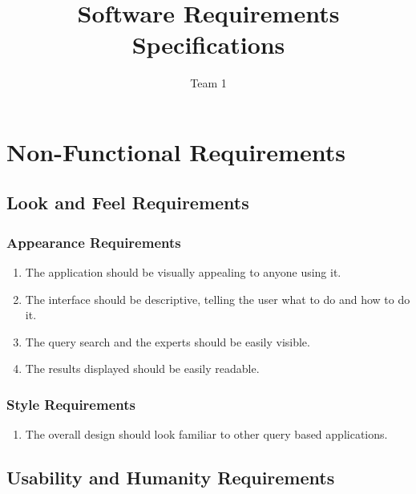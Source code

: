 \documentclass[]{article}
\title{Software Requirements Specifications}
\author{Team 1}
\begin{document}
\maketitle	

\section{Non-Functional Requirements} \label{nfreq}
\label{sec:non-functional_requirements}
\subsection{Look and Feel Requirements}
\label{sub:look_and_feel_requirements}


\subsubsection{Appearance Requirements}
\label{ssub:appearance_requirements}
\begin{enumerate}[{LF}1. ]
	\item The application should be visually appealing to anyone using it.
	\item The interface should be descriptive, telling the user what to do and how to do it.
	\item The query search and the experts should be easily visible.
	\item The results displayed should be easily readable.
	\setcounter{placeholder}{\theenumi}
\end{enumerate}

\subsubsection{Style Requirements}
\label{ssub:style_requirements}
\begin{enumerate}[{LF}5. ]
	\item The overall design should look familiar to other query based applications.
\end{enumerate}


\subsection{Usability and Humanity Requirements}
\label{sub:usability_and_humanity_requirements}
\end{document}
